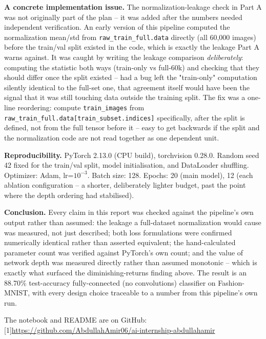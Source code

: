 \documentclass[11pt,a4paper]{article}
\begin{document}
\textbf{A concrete implementation issue.} The normalization-leakage check in Part A was
not originally part of the plan -- it was added after the numbers needed independent
verification. An early version of this pipeline computed the normalization mean/std
from \texttt{raw\_train\_full.data} directly (all 60,000 images) before the train/val
split existed in the code, which is exactly the leakage Part A warns against. It was
caught by writing the leakage comparison \emph{deliberately}: computing the statistic
both ways (train-only vs full-60k) and checking that they should differ once the split
existed -- had a bug left the "train-only" computation silently identical to the full-set
one, that agreement itself would have been the signal that it was still touching data
outside the training split. The fix was a one-line reordering: compute
\texttt{train\_images} from \texttt{raw\_train\_full.data[train\_subset.indices]}
specifically, after the split is defined, not from the full tensor before it -- easy to
get backwards if the split and the normalization code are not read together as one
dependent unit.

\textbf{Reproducibility.} PyTorch 2.13.0 (CPU build), torchvision 0.28.0. Random seed 42
fixed for the train/val split, model initialisation, and DataLoader shuffling.
Optimizer: Adam, lr=$10^{-3}$. Batch size: 128. Epochs: 20 (main model), 12 (each
ablation configuration -- a shorter, deliberately lighter budget, past the point where
the depth ordering had stabilised).

\textbf{Conclusion.} Every claim in this report was checked against the pipeline's own
output rather than assumed: the leakage a full-dataset normalization would cause was
measured, not just described; both loss formulations were confirmed numerically
identical rather than asserted equivalent; the hand-calculated parameter count was
verified against PyTorch's own count; and the value of network depth was measured
directly rather than assumed monotonic -- which is exactly what surfaced the
diminishing-returns finding above. The result is an 88.70\% test-accuracy
fully-connected (no convolutions) classifier on Fashion-MNIST, with every design choice traceable to a
number from this pipeline's own run.

\vspace{0.4cm}
\noindent The notebook and README are on GitHub: {\small\scalebox{0.72}[1]{\url{https://github.com/AbdullahAmir06/ai-internship-abdullahamir}}}
\end{document}
